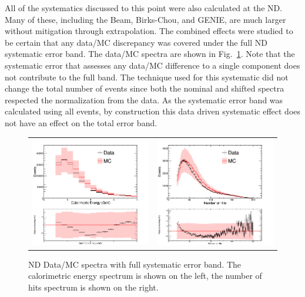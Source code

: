 All of the systematics discussed to this point were also calculated at the ND. Many of these, including the Beam, Birks-Chou, and GENIE, are much larger without mitigation through extrapolation. The combined effects were studied to be certain that any data/MC discrepancy was covered under the full ND systematic error band. The data/MC spectra are shown in Fig.~\ref{fig:NDSystBand}. Note that the systematic error that assesses any data/MC difference to a single component does not contribute to the full band. The technique used for this systematic did not change the total number of events since both the nominal and shifted spectra respected the normalization from the data. As the systematic error band was calculated using all events, by construction this data driven systematic effect does not have an effect on the total error band.
\begin{figure}[h]
  \centering
  \begin{tabular}{c c}
    \includegraphics[width=.44\textwidth]{figures/cCalENDAll.png} &
    \includegraphics[width=.44\textwidth]{figures/cNHitNDAll.png} \\
  \end{tabular}
  \caption[ND Data/MC Spectra with Systematics]{ND Data/MC spectra with full systematic error band. The calorimetric energy spectrum is shown on the left, the number of hits spectrum is shown on the right.}
  \label{fig:NDSystBand}
\end{figure}

